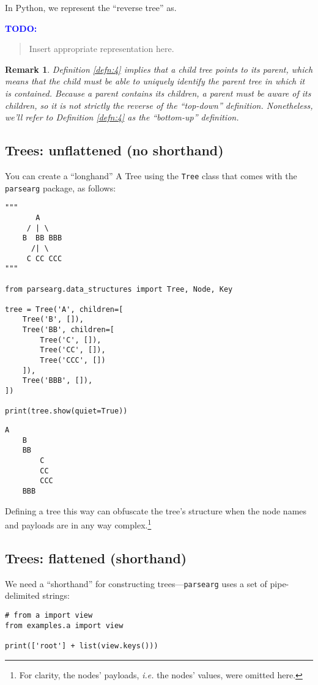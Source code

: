 \documentclass[10pt]{amsart}
\numberwithin{equation}{section}
\newtheorem{remark}{Remark}[section]
\begin{document}
In Python, we represent the ``reverse tree'' as.

\textcolor{blue}{\bf TODO:}
\begin{quote}
Insert appropriate representation here. 
\end{quote}

\begin{remark}
Definition \ref{defn:4} implies that a child tree points to its parent, which means
that the child must be able to uniquely identify the parent tree in which
it is contained. Because a parent contains its children, a parent must
be aware of its children, so it is not strictly the reverse of the 
``top-down'' definition. Nonetheless, we'll refer to Definition 
\ref{defn:4} as the ``bottom-up'' definition.
\end{remark}

\subsection{Trees: unflattened (no shorthand)}
\label{sec:org78781e6}
You can create a ``longhand'' A Tree using the 
\texttt{Tree} class that comes with the \texttt{parsearg} package, as follows: 
\begin{verbatim}
"""
       A
     / | \
    B  BB BBB
      /| \
     C CC CCC
"""

from parsearg.data_structures import Tree, Node, Key

tree = Tree('A', children=[
    Tree('B', []),
    Tree('BB', children=[
        Tree('C', []),
        Tree('CC', []),
        Tree('CCC', [])
    ]),
    Tree('BBB', []),
])

print(tree.show(quiet=True))
\end{verbatim}

\begin{verbatim}
A
    B
    BB
        C
        CC
        CCC
    BBB
\end{verbatim}


Defining a tree this way can obfuscate the tree's structure when the node names and 
payloads are in any way complex.\footnote{For clarity, the nodes' payloads, \emph{i.e.} the nodes' values, were omitted here.} 

\subsection{Trees: flattened (shorthand)}
\label{sec:orgba53bd3}
We need a ``shorthand'' for constructing trees---\texttt{parsearg} uses a set of pipe-delimited strings: 
\begin{verbatim}
# from a import view
from examples.a import view

print(['root'] + list(view.keys()))
\end{verbatim}
\end{document}
